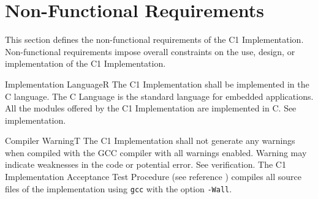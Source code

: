 \documentclass[requirements]{../fwprofile}
\begin{document}
\section{Non-Functional Requirements}

This section defines the non-functional requirements of the C1 Implementation. Non-functional requirements impose overall constraints on the use, 
design, or implementation of the C1 Implementation.

\label{req:codingReqs}

\begin{fw_req}{Implementation Language}{R}
{The C1 Implementation shall be implemented in the C language.}
{The C Language is the standard language for embedded applications.}
{All the modules offered by the C1 Implementation are implemented in C.} 
{See implementation.}
\end{fw_req}


\begin{fw_req}{Compiler Warning}{T}
{The C1 Implementation shall not generate any warnings when compiled with the GCC compiler with all warnings enabled.}
{Warning may indicate weaknesses in the code or potential error.}
{See verification.} 
{The C1 Implementation Acceptance Test Procedure (see reference \cite{ref:um}) compiles all source files of the implementation using \texttt{gcc} with the option \texttt{-Wall}.}
\end{fw_req}
\end{document}
